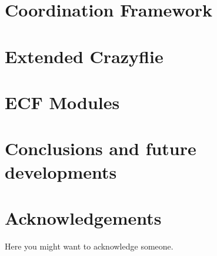\documentclass{Configuration_Files/PoliMi3i_thesis}
\begin{document}
\chapter{Coordination Framework}
\label{ch:coordination}


\chapter{Extended Crazyflie}
\label{ch:ecf}


\chapter{ECF Modules}
\label{ch:modules}


\chapter{Conclusions and future developments}
\label{ch:conclusions}





\cleardoublepage
{} %



\listoffigures

\listoftables

\chapter*{Acknowledgements}
Here you might want to acknowledge someone.

\cleardoublepage
\end{document}
